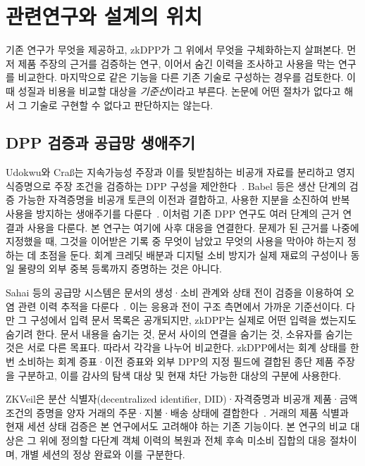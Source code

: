 \section{관련연구와 설계의 위치}
\label{sec:related}

기존 연구가 무엇을 제공하고, zkDPP가 그 위에서 무엇을
구체화하는지 살펴본다. 먼저 제품 주장의 근거를 검증하는 연구,
이어서 숨긴 이력을 조사하고 사용을 막는 연구를 비교한다.
마지막으로 같은 기능을 다른 기존 기술로 구성하는 경우를 검토한다.
이때 성질과 비용을 비교할 대상을 \emph{기준선}이라고 부른다.
논문에 어떤 절차가 없다고 해서 그 기술로 구현할 수 없다고
판단하지는 않는다.

\subsection{DPP 검증과 공급망 생애주기}

Udokwu와 Craß는 지속가능성 주장과 이를 뒷받침하는 비공개 자료를
분리하고 영지식증명으로 주장 조건을 검증하는 DPP 구성을
제안한다~\cite{udokwu-crass-2026}. Babel 등은 생산 단계의 검증 가능한
자격증명을 비공개 토큰의 이전과 결합하고, 사용한 지분을 소진하여
반복 사용을 방지하는 생애주기를 다룬다~\cite{babel-hicss-2025}.
이처럼 기존 DPP 연구도 여러 단계의 근거 연결과 사용을 다룬다.
본 연구는 여기에 사후 대응을 연결한다.
문제가 된 근거를 나중에 지정했을 때, 그것을 이어받은 기록 중
무엇이 남았고 무엇의 사용을 막아야 하는지 정하는 데 초점을 둔다. 회계 크레딧 배분과 디지털 소비 방지가 실제 재료의
구성이나 동일 물량의 외부 중복 등록까지 증명하는 것은 아니다.

Sahai 등의 공급망 시스템은 문서의 생성·소비 관계와 상태 전이 검증을
이용하여 오염 관련 이력 추적을 다룬다~\cite{sahai-supply-chain-2020}.
이는 응용과 전이 구조 측면에서 가까운 기준선이다. 다만 그 구성에서
입력 문서 목록은 공개되지만, zkDPP는 실제로 어떤 입력을 썼는지도
숨기려 한다. 문서 내용을 숨기는 것, 문서 사이의 연결을 숨기는 것,
소유자를 숨기는 것은 서로 다른 목표다. 따라서 각각을 나누어 비교한다.
zkDPP에서는 회계 상태를 한 번 소비하는 회계 증표·이전 증표와 외부 DPP의
지정 필드에 결합된 종단 제품 주장을 구분하고, 이를 감사의 탐색 대상 및
현재 차단 가능한 대상의 구분에 사용한다.

ZKVeil은 분산 식별자(decentralized identifier, DID)·자격증명과 비공개 제품·금액 조건의 증명을 양자 거래의
주문·지불·배송 상태에 결합한다~\cite{cao-zkveil-2026}. 거래의 제품
식별과 현재 세션 상태 검증은 본 연구에서도 고려해야 하는 기존 기능이다.
본 연구의 비교 대상은 그 위에 정의할 다단계 객체 이력의 복원과 전체
후속 미소비 집합의 대응 절차이며, 개별 세션의 정상 완료와 이를 구분한다.

